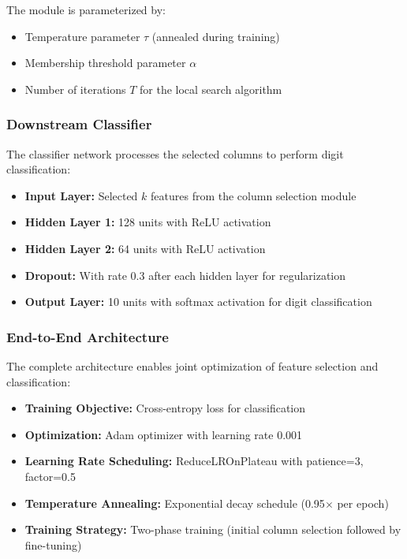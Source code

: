 \documentclass{article}
\begin{document}
The module is parameterized by:
\begin{itemize}
    \item Temperature parameter $\tau$ (annealed during training)
    \item Membership threshold parameter $\alpha$
    \item Number of iterations $T$ for the local search algorithm
\end{itemize}

\subsubsection{Downstream Classifier}
The classifier network processes the selected columns to perform digit classification:

\begin{itemize}
    \item \textbf{Input Layer:} Selected $k$ features from the column selection module
    \item \textbf{Hidden Layer 1:} 128 units with ReLU activation
    \item \textbf{Hidden Layer 2:} 64 units with ReLU activation 
    \item \textbf{Dropout:} With rate 0.3 after each hidden layer for regularization
    \item \textbf{Output Layer:} 10 units with softmax activation for digit classification
\end{itemize}

\subsubsection{End-to-End Architecture}
The complete architecture enables joint optimization of feature selection and classification:

\begin{itemize}
    \item \textbf{Training Objective:} Cross-entropy loss for classification
    \item \textbf{Optimization:} Adam optimizer with learning rate 0.001
    \item \textbf{Learning Rate Scheduling:} ReduceLROnPlateau with patience=3, factor=0.5
    \item \textbf{Temperature Annealing:} Exponential decay schedule (0.95$\times$ per epoch)
    \item \textbf{Training Strategy:} Two-phase training (initial column selection followed by fine-tuning)
\end{itemize}
\end{document}
